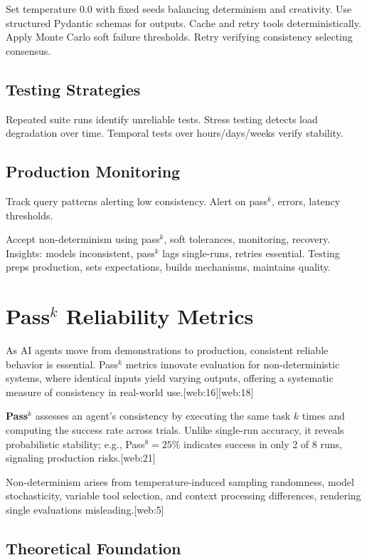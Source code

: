 \begin{TNtwocol}
Set temperature 0.0 with fixed seeds balancing determinism and creativity. Use structured Pydantic schemas for outputs. Cache and retry tools deterministically. Apply Monte Carlo soft failure thresholds. Retry verifying consistency selecting consensus.

\subsection*{Testing Strategies}

Repeated suite runs identify unreliable tests. Stress testing detects load degradation over time. Temporal tests over hours/days/weeks verify stability.

\subsection*{Production Monitoring}

Track query patterns alerting low consistency. Alert on pass$^k$, errors, latency thresholds.


Accept non-determinism using pass$^k$, soft tolerances, monitoring, recovery. Insights: models inconsistent, pass$^k$ lags single-runs, retries essential. Testing preps production, sets expectations, builds mechanisms, maintains quality.

\section{Pass$^k$ Reliability Metrics}


As AI agents move from demonstrations to production, consistent reliable behavior is essential. Pass$^k$ metrics innovate evaluation for non-deterministic systems, where identical inputs yield varying outputs, offering a systematic measure of consistency in real-world use.[web:16][web:18]

\textbf{Pass$^k$} assesses an agent's consistency by executing the same task $k$ times and computing the success rate across trials. Unlike single-run accuracy, it reveals probabilistic stability; e.g., Pass$^8 = 25\%$ indicates success in only 2 of 8 runs, signaling production risks.[web:21]

Non-determinism arises from temperature-induced sampling randomness, model stochasticity, variable tool selection, and context processing differences, rendering single evaluations misleading.[web:5]

\subsection*{Theoretical Foundation}


\end{TNtwocol}

